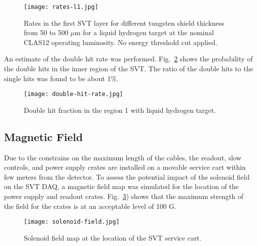 \begin{figure}[hbt] 
\centering 
\texttt{[image: rates-l1.jpg]}
\caption{Rates in the first SVT layer for different tungsten shield thickness from 50 to 500 $\mu$m for a liquid hydrogen target at the nominal CLAS12 operating luminosity. No energy threshold cut applied.}
\label{fig:rates-l1}
\end{figure}

An estimate of the double hit rate was performed. Fig.~\ref{fig:double-hit-rate} shows the probability of the double hits in the inner region of the SVT. The ratio of the double hits to the single hits was found to be about 1$\%$.

\begin{figure}[hbt] 
\centering 
\texttt{[image: double-hit-rate.jpg]}
\caption{Double hit fraction in the region 1 with liquid hydrogen target.}
\label{fig:double-hit-rate}
\end{figure}

\subsection{Magnetic Field}

Due to the constrains on the maximum length of the cables, the readout, slow controls, and power supply crates are installed on a movable service cart within few meters from the detector. To assess the potential impact of the solenoid field on the SVT DAQ, a magnetic field map was simulated for the location of the power supply and readout crates. Fig.~\ref{fig:solenoid-field}) shows that the maximum strength of the field for the crates is at an acceptable level of 100 G.

\begin{figure}[hbt] 
\centering 
\texttt{[image: solenoid-field.jpg]}
\caption{Solenoid field map at the location of the SVT service cart.}
\label{fig:solenoid-field}
\end{figure}



